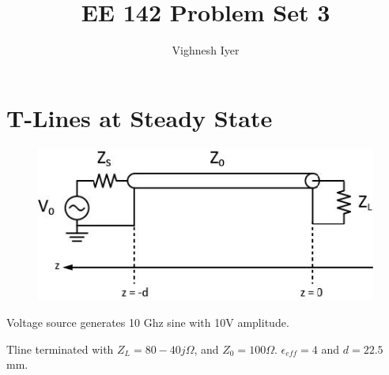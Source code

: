 \documentclass[11pt]{article}
\begin{document}
\title{EE 142 Problem Set 3}

\author{Vighnesh Iyer}
\date{}
\maketitle

\section{T-Lines at Steady State}

\begin{figure}[H]
	\centering \includegraphics[width=\textwidth-7cm]{images/problem1.jpg}
\end{figure}

Voltage source generates 10 Ghz sine with 10V amplitude.

Tline terminated with $Z_L = 80 - 40j \Omega$, and $Z_0 = 100\Omega$. $\epsilon_{eff} = 4$ and $d = 22.5$ mm.
\end{document}
